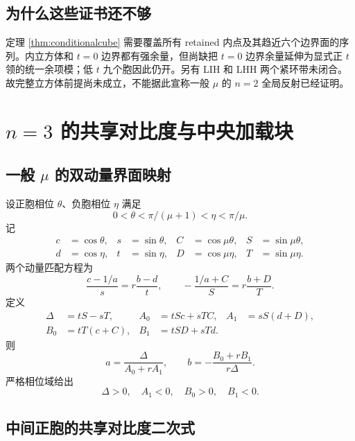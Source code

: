 \documentclass[UTF8,12pt,openany,fontset=fandol]{ctexrep}
\theoremstyle{definition}
\begin{document}
\section{为什么这些证书还不够}

定理 \ref{thm:conditionalcube} 需要覆盖所有 retained 内点及其趋近六个边界面的序列。内立方体和 $t=0$ 边界都有强余量，但尚缺把 $t=0$ 边界余量延伸为显式正 $t$ 领的统一余项模；低 $t$ 九个胞因此仍开。另有 $\mathrm{LIH}$ 和 $\mathrm{LHH}$ 两个紧环带未闭合。故完整立方体前提尚未成立，不能据此宣称一般 $\mu$ 的 $n=2$ 全局反射已经证明。

\chapter{$n=3$ 的共享对比度与中央加载块}

\section{一般 $\mu$ 的双动量界面映射}

设正胞相位 $\theta$、负胞相位 $\eta$ 满足
\begin{equation}
 0<\theta<\pi/(\mu+1)<\eta<\pi/\mu.
\end{equation}
记
\begin{align*}
 c&=\cos\theta,&s&=\sin\theta,&C&=\cos\mu\theta,&S&=\sin\mu\theta,\\
 d&=\cos\eta,&t&=\sin\eta,&D&=\cos\mu\eta,&T&=\sin\mu\eta.
\end{align*}
两个动量匹配方程为
\begin{equation}
 \frac{c-1/a}{s}=r\frac{b-d}{t},\qquad
 -\frac{1/a+C}{S}=r\frac{b+D}{T}.
\end{equation}
定义
\begin{align*}
 \Delta&=tS-sT,&A_0&=tSc+sTC,&A_1&=sS(d+D),\\
 B_0&=tT(c+C),&B_1&=tSD+sTd.
\end{align*}
则
\begin{equation}\label{eq:geninterface}
 a=\frac\Delta{A_0+rA_1},\qquad
 b=-\frac{B_0+rB_1}{r\Delta}.
\end{equation}
严格相位域给出
\begin{equation}
 \Delta>0,\quad A_1<0,\quad B_0>0,\quad B_1<0.
\end{equation}

\section{中间正胞的共享对比度二次式}
\end{document}
